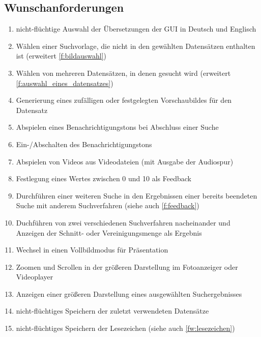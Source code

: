 \subsection{Wunschanforderungen}
\begin{enumerate} [label=\bfseries /FW \arabic*0/, leftmargin=*]
	\item nicht-flüchtige Auswahl der Übersetzungen der \gls{GUI} in Deutsch und Englisch \label{fw:sprache}
	\newline
	\item Wählen einer Suchvorlage, die nicht in den gewählten Datensätzen enthalten ist (erweitert \ref{f:bildauswahl})
	\item Wählen von mehreren Datensätzen, in denen gesucht wird (erweitert \ref{f:auswahl_eines_datensatzes})
	\item Generierung eines zufälligen oder festgelegten Vorschaubildes für den Datensatz \label{fw:vorschaubild}
	\newline
	\item Abspielen eines Benachrichtigungstons bei Abschluss einer Suche \label{fw:signalton}
	\item Ein-/Abschalten des Benachrichtigungstons \label{fw:signalton_einaus}
	\item Abspielen von Videos aus Videodateien (mit Ausgabe der Audiospur) \label{fw:echtes_video_abspielen}
	\newline
	\item Festlegung eines Wertes zwischen 0 und 10 als Feedback \label{fw:zehner_feedback}
	\item Durchführen einer weiteren Suche in den Ergebnissen einer bereits beendeten Suche mit anderem Suchverfahren (siehe auch \ref{f:feedback})
	\item Duchführen von zwei verschiedenen Suchverfahren nacheinander und Anzeigen der Schnitt- oder Vereinigungsmenge als Ergebnis
	\newline
	\item Wechsel in einen Vollbildmodus für Präsentation \label{fw:präsentation}
	\item Zoomen und Scrollen in der größeren Darstellung im Fotoanzeiger oder Videoplayer \label{fw:zoom_scroll}
	\item Anzeigen einer größeren Darstellung eines ausgewählten Suchergebnisses \label{fw:groesseres_suchergebnis}
	\newline
	\item nicht-flüchtiges Speichern der zuletzt verwendeten Datensätze \label{fw:speichern_historie}
	\item nicht-flüchtiges Speichern der Lesezeichen (siehe auch \ref{fw:lesezeichen}) \label{fw:speichern_lesezeichen}

\end{enumerate}
